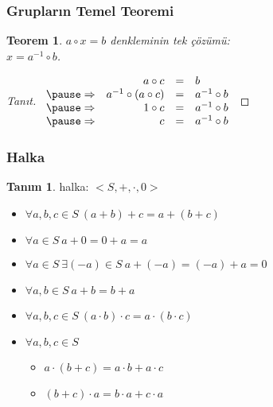 \documentclass[dvipsnames]{beamer}
\theoremstyle{definition}
\newtheorem{tanim}[theorem]{Tanım}
\theoremstyle{example}
\theoremstyle{plain}
\newtheorem{teorem}[theorem]{Teorem}
\begin{document}
\begin{frame}
  \frametitle{Grupların Temel Teoremi}

  \begin{teorem}
    $a \circ x = b$ denkleminin tek çözümü:\\
    $x = a^{-1} \circ b$.
  \end{teorem}

  \pause
  \begin{proof}[Tanıt]
    $\begin{array}{crcl}
                & a \circ c                & = & b\\\pause
    \Rightarrow & a^{-1} \circ (a \circ c) & = & a^{-1} \circ b\\\pause
    \Rightarrow & 1 \circ c                & = & a^{-1} \circ b\\\pause
    \Rightarrow & c                        & = & a^{-1} \circ b
    \end{array}$
  \end{proof}
\end{frame}

\begin{frame}
  \frametitle{Halka}

  \begin{tanim}
    \alert{halka}: $<S,+,\cdot,0>$

    \begin{itemize}
      \item $\forall a,b,c \in S~(a + b) + c = a + (b + c)$
      \item $\forall a \in S~a + 0 = 0 + a = a$
      \item $\forall a \in S~\exists (-a) \in S~a + (-a) = (-a) + a = 0$
      \item $\forall a,b \in S~a + b = b + a$

      \pause
      \item $\forall a,b,c \in S~(a \cdot b) \cdot c = a \cdot (b \cdot c)$

      \pause
      \item $\forall a,b,c \in S$
      \begin{itemize}
        \item $a \cdot (b + c) = a \cdot b + a \cdot c$
        \item $(b + c) \cdot a = b \cdot a + c \cdot a$
      \end{itemize}
    \end{itemize}
  \end{tanim}
\end{frame}
\end{document}

